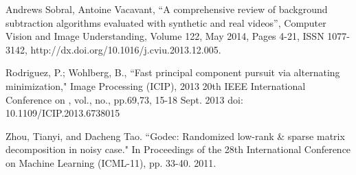\documentclass[conference]{IEEEtran}
\begin{document}
\begin{thebibliography}{7}
Andrews Sobral, Antoine Vacavant, ``A comprehensive review of background subtraction algorithms evaluated with synthetic and real videos'', Computer Vision and Image Understanding, Volume 122, May 2014, Pages 4-21, ISSN 1077-3142, http://dx.doi.org/10.1016/j.cviu.2013.12.005.

Rodriguez, P.; Wohlberg, B., ``Fast principal component pursuit via alternating minimization," Image Processing (ICIP), 2013 20th IEEE International Conference on , vol., no., pp.69,73, 15-18 Sept. 2013
doi: 10.1109/ICIP.2013.6738015


Zhou, Tianyi, and Dacheng Tao. ``Godec: Randomized low-rank \& sparse matrix decomposition in noisy case." In Proceedings of the 28th International Conference on Machine Learning (ICML-11), pp. 33-40. 2011.


\end{thebibliography}
\end{document}
